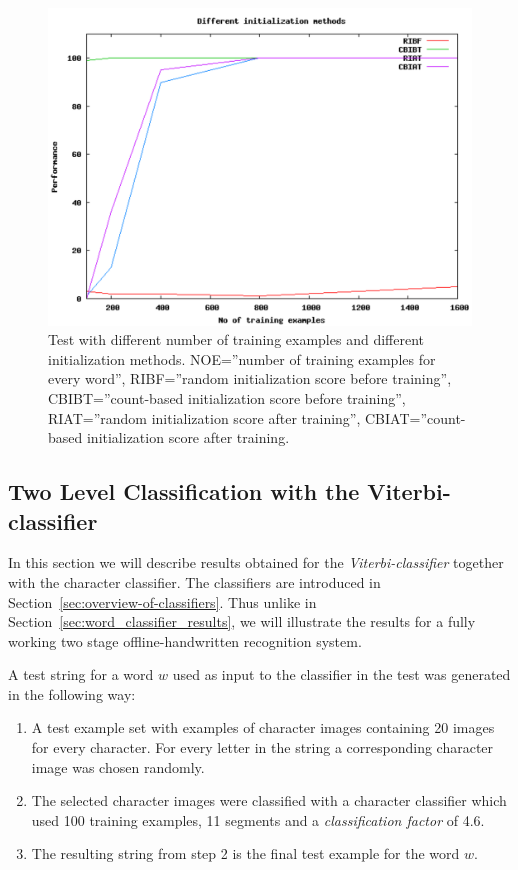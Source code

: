\begin{figure}[h!]
\centering
\includegraphics[scale=0.57]{initialization-methods}
\caption{Test with different number of training examples and different initialization methods.
	 NOE=''number of training examples for every word'',
         RIBF=''random initialization score before training'',
         CBIBT=''count-based initialization score before training'',
         RIAT=''random initialization score after training'',
         CBIAT=''count-based initialization score after training.}
\label{figure:initialization-methods}
\end{figure}

\subsection{Two Level Classification with the Viterbi-classifier}\label{sec:result-viterbi}
In this section we will describe results obtained for the \emph{Viterbi-classifier} together with the character classifier.
The classifiers are introduced in Section~\ref{sec:overview-of-classifiers}.
Thus unlike in Section~\ref{sec:word_classifier_results},  we will illustrate the results for a fully working two stage offline-handwritten recognition system.


A test string for a word $w$ used as input to the classifier in the test was generated in the following way:

\begin{enumerate}
 \item A test example set with examples of character images containing 20 images for every character. 
For every letter in the string a corresponding character image was chosen randomly.
 \item The selected character images were classified with a character classifier which used 100 training examples, 11 segments and a \textit{classification factor} of 4.6.
 \item The resulting string from step 2 is the final test example for the word $w$.
\end{enumerate}

